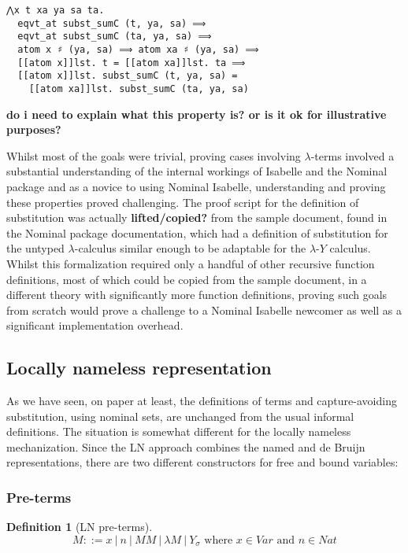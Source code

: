 \documentclass[a4paper, 12pt, twoside]{style/ociamthesis}
\theoremstyle{plain}
\theoremstyle{definition}
\newtheorem{Definition}{Definition}[chapter]
\theoremstyle{remark}
\newcommand{\lamy}{\lambda\text{-}Y}
\begin{document}
\begin{verbatim}
⋀x t xa ya sa ta.
  eqvt_at subst_sumC (t, ya, sa) ⟹
  eqvt_at subst_sumC (ta, ya, sa) ⟹
  atom x ♯ (ya, sa) ⟹ atom xa ♯ (ya, sa) ⟹ 
  [[atom x]]lst. t = [[atom xa]]lst. ta ⟹ 
  [[atom x]]lst. subst_sumC (t, ya, sa) = 
    [[atom xa]]lst. subst_sumC (ta, ya, sa)
\end{verbatim}

\textbf{do i need to explain what this property is? or is it ok for
illustrative purposes?}

Whilst most of the goals were trivial, proving cases involving
\(\lambda\)-terms involved a substantial understanding of the internal
workings of Isabelle and the Nominal package and as a novice to using
Nominal Isabelle, understanding and proving these properties proved
challenging. The proof script for the definition of substitution was
actually \textbf{lifted/copied?} from the sample document, found in the
Nominal package documentation, which had a definition of substitution
for the untyped \(\lambda\)-calculus similar enough to be adaptable for
the \(\lamy\) calculus.\\
Whilst this formalization required only a handful of other recursive
function definitions, most of which could be copied from the sample
document, in a different theory with significantly more function
definitions, proving such goals from scratch would prove a challenge to
a Nominal Isabelle newcomer as well as a significant implementation
overhead.

\subsection{Locally nameless
representation}\label{locally-nameless-representation}

As we have seen, on paper at least, the definitions of terms and
capture-avoiding substitution, using nominal sets, are unchanged from
the usual informal definitions. The situation is somewhat different for
the locally nameless mechanization. Since the LN approach combines the
named and de Bruijn representations, there are two different
constructors for free and bound variables:

\subsubsection{Pre-terms}\label{pre-terms}

\begin{Definition}[LN pre-terms]

\label{pterms}
\[M::= x\ |\ n\ |\ MM\ |\ \lambda M\ |\ Y_\sigma \text{ where }x \in Var \text{ and } n \in Nat\]

\end{Definition}
\end{document}
